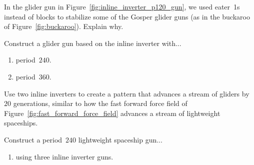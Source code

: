 \vspace*{-0.4cm}\hrulefill\vspace*{-0.3cm}\footnotesize\begin{multicols}{2}\vspace*{-0.4cm}\raggedcolumns{}
\setlength{\parskip}{0pt}\ifdefined\FORPRINTING{}\else%
\fi
	
	
	\begin{problemstar}\label{exer:inline_inverter_gun_why_buckaroo} 
		In the glider gun in Figure~\ref{fig:inline_inverter_p120_gun}, we used eater~1s instead of blocks to stabilize some of the Gosper glider guns (as in the buckaroo of Figure~\ref{fig:buckaroo}). Explain why.
	\end{problemstar}
	
	
	\mfilbreak
	
	
	\begin{problem}\label{exer:inline_inverter_gun_high_period} 
		Construct a glider gun based on the inline inverter with...\smallskip
		
		\begin{enumerate}[label=\bf\color{ocre}(\alph*)]
			\item period~$240$.
			
			\item period~$360$.
		\end{enumerate}
	\end{problem}
	
	
	\mfilbreak
	
	
	\begin{problem}\label{exer:inline_inverter_advancer} 
		Use two inline inverters to create a pattern that advances a stream of gliders by $20$ generations, similar to how the fast forward force field of Figure~\ref{fig:fast_forward_force_field} advances a stream of lightweight spaceships.
	\end{problem}
	
	
	\mfilbreak
	
	
	\begin{problem}\label{exer:inline_inverter_lwss_gun} 
		Construct a period~$240$ lightweight spaceship gun...\smallskip
		
		\begin{enumerate}[label=\bf\color{ocre}(\alph*)]
			\item using three inline inverter guns.
			

\end{enumerate}
\end{problem}
\end{multicols}
